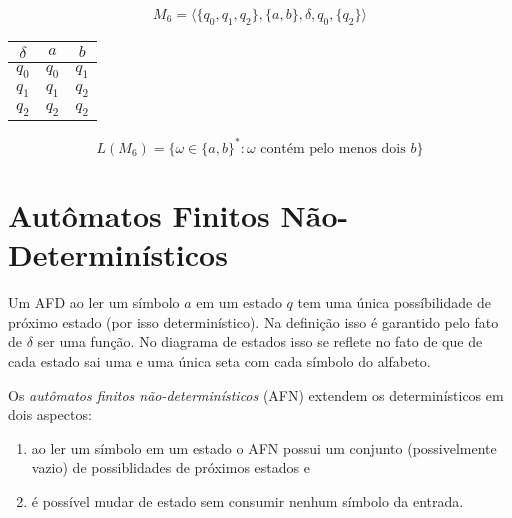 \begin{example}
  \begin{displaymath}
    M_6 = \langle \{q_0, q_1, q_2\}, \{a,b\}, \delta, q_0, \{q_2\}\rangle
  \end{displaymath}

  \begin{center}
  \begin{tabular}{c|cc}
    $\delta$ & $a$ & $b$ \\
    \hline
    $q_0$ & $q_0$ & $q_1$\\
    $q_1$ & $q_1$ & $q_2$\\
    $q_2$ & $q_2$ & $q_2$\\
  \end{tabular}
  \end{center}

  \begin{center}
  \end{center}

  \begin{displaymath}
    L(M_6) = \{\omega \in \{a,b\}^* : \omega \textrm{ contém pelo menos dois } b \}
  \end{displaymath}
\end{example}

\section{Autômatos Finitos Não-Determinísticos}
\label{sec:afn}

Um AFD ao ler um símbolo $a$ em um estado $q$ tem uma única possíbilidade de próximo estado (por isso determinístico).
Na definição isso é garantido pelo fato de $\delta$ ser uma função.
No diagrama de estados isso se reflete no fato de que de cada estado sai uma e uma única seta com cada símbolo do alfabeto.

Os {\em autômatos finitos não-determinísticos} (AFN) extendem os determinísticos em dois aspectos:
\begin{enumerate}
\item ao ler um símbolo em um estado o AFN possui um conjunto (possivelmente vazio) de possiblidades de próximos estados e
\item é possível mudar de estado sem consumir nenhum símbolo da entrada.
\end{enumerate}

